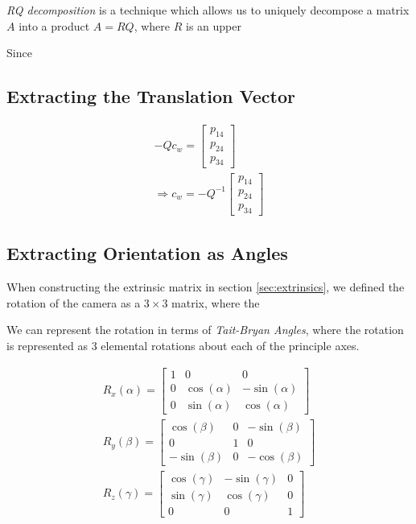 \emph{RQ decomposition} is a technique which allows us to uniquely decompose a matrix $A$ into a product $A=RQ$, where $R$ is an upper

Since

\subsection{Extracting the Translation Vector}

\begin{gather}
    -Qc_w =
    \begin{bmatrix}
        p_{14} \\ p_{24} \\ p_{34}
    \end{bmatrix} \nonumber \\
    \Rightarrow c_w = -Q^{-1}
    \begin{bmatrix}
        p_{14} \\ p_{24} \\ p_{34}
    \end{bmatrix}
\end{gather}




\subsection{Extracting Orientation as Angles}

When constructing the extrinsic matrix in section \ref{sec:extrinsics}, we defined the rotation of the camera as a $3 \times 3$ matrix, where the

We can represent the rotation in terms of \emph{Tait-Bryan Angles}, where the rotation is represented as 3 elemental rotations about each of the principle axes.

\begin{subequations}
    \begin{gather}
        R_x(\alpha) =
        \begin{bmatrix}
            1 & 0            & 0             \\
            0 & \cos(\alpha) & -\sin(\alpha) \\
            0 & \sin(\alpha) & \cos(\alpha)
        \end{bmatrix} \\
        R_y(\beta) =
        \begin{bmatrix}
            \cos(\beta)  & 0 & -\sin(\beta) \\
            0            & 1 & 0            \\
            -\sin(\beta) & 0 & -\cos(\beta)
        \end{bmatrix} \\
        R_z(\gamma) =
        \begin{bmatrix}
            \cos(\gamma) & -\sin(\gamma) & 0 \\
            \sin(\gamma) & \cos(\gamma)  & 0 \\
            0            & 0             & 1
        \end{bmatrix}
    \end{gather}
\end{subequations}


